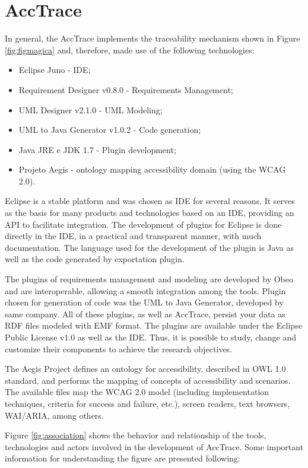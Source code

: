 \documentclass[10pt, conference, compsocconf]{IEEEtran}
\begin{document}
\section{AccTrace}

In general, the AccTrace implements the traceability mechanism shown in
Figure \ref{fig:figmagica} and, therefore, made use of the following technologies:


\begin{itemize}
  \item Eclipse Juno - IDE;
  \item Requirement Designer v0.8.0 - Requirements Management;
  \item UML Designer v2.1.0 - UML Modeling;
  \item UML to Java Generator v1.0.2 - Code generation;
  \item Java JRE e JDK 1.7 - Plugin development;
  \item Projeto Aegis - ontology mapping accessibility domain (using the WCAG 2.0).
\end{itemize}

Eclipse is a stable platform and was chosen as IDE for several reasons. It
serves as the basis for many products and technologies based on an IDE, providing
an API to facilitate integration. The development of plugins for Eclipse is done directly in the IDE,
in a practical and transparent manner, with much documentation. The language
used for the development of the plugin is Java as well as the code
generated by exportation plugin.

The plugins of requirements management and modeling are developed by Obeo and are interoperable, allowing a smooth integration among the tools. Plugin chosen for generation of code was the UML to Java Generator, developed by
same company. All of these plugins, as well as AccTrace, persist your data as RDF files modeled with EMF format. 
The plugins are available under the Eclipse Public License v1.0 as well as the IDE. Thus, it is possible to study, change and customize their components to achieve the research objectives.

The Aegis Project \cite{aegis:13} defines an ontology for accessibility, described in OWL 1.0 standard, and performs the mapping of concepts of accessibility and scenarios. The available files map the WCAG 2.0 model (including implementation techniques, criteria for success and failure, etc.), screen readers, text browsers, WAI/ARIA, among others.


Figure \ref{fig:association} shows the behavior and relationship of the tools, technologies
and actors involved in the development of AccTrace. Some important information for understanding the figure are presented following:
\end{document}

